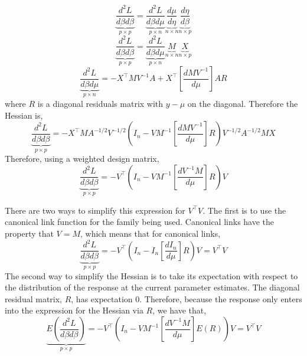 \documentclass{jss}
\begin{document}
\begin{equation}
\underbrace{\frac{d^2 L}{d\beta d\beta}}_{p\times p} = 
\underbrace{\frac{d^2 L}{d\beta d\mu}}_{p\times n}
\underbrace{\frac{d\mu}{d\eta}}_{n\times n}
\underbrace{\frac{d\eta}{d\beta}}_{n\times p}
\end{equation}
\begin{equation}
\underbrace{\frac{d^2 L}{d\beta d\beta}}_{p\times p} = 
\underbrace{\frac{d^2 L}{d\beta d\mu}}_{p\times n}
\underbrace{M}_{n\times n}
\underbrace{X}_{n\times p}
\end{equation}
\begin{equation}
\underbrace{\frac{d^2 L}{d\beta d\mu}}_{p\times n} =
-X^\top M V^{-1} A  + 
X^\top \left[ \frac{dMV^{-1}}{d\mu} \right] A R
\end{equation}
where $R$ is a diagonal residuals matrix with $y-\mu$ on the
diagonal. Therefore the Hessian is,
\begin{equation}
\underbrace{\frac{d^2 L}{d\beta d\beta}}_{p\times p} = 
-X^\top M A^{-1/2}V^{-1/2}\left( 
I_n - 
VM^{-1}\left[ \frac{dMV^{-1}}{d\mu} \right] R
\right)V^{-1/2}A^{-1/2} M X
\label{eq:betaHessian}
\end{equation}
Therefore, using a weighted design matrix,
\begin{equation}
\underbrace{\frac{d^2 L}{d\beta d\beta}}_{p\times p} = 
-V^\top\left( 
I_n - 
VM^{-1}\left[ \frac{dV^{-1}M}{d\mu} \right] R
\right)V
\label{eq:betaHessian}
\end{equation}

There are two ways to simplify this expression for $V^\top V$. The
first is to use the canonical link function for the family being
used. Canonical links have the property that $V = M$, which means
that for canonical links,
\begin{equation}
\underbrace{\frac{d^2 L}{d\beta d\beta}}_{p\times p} = 
-V^\top\left( 
I_n - 
I_n \left[ \frac{dI_n}{d\mu} \right] R
\right)V = V^\top V
\end{equation}
The second way to simplify the Hessian is to take its expectation with
respect to the distribution of the response at the current
parameter estimates. The diagonal residual matrix, $R$, has
expectation 0. Therefore, because the response only enters into the
expression for the Hessian via $R$, we have that,
\begin{equation}
\underbrace{E\left(\frac{d^2 L}{d\beta d\beta}\right)}_{p\times p} = 
-V^\top\left( 
I_n - 
VM^{-1}\left[ \frac{dV^{-1}M}{d\mu} \right] E(R)
\right)V = V^\top V
\label{eq:betaHessian}
\end{equation}
\end{document}
